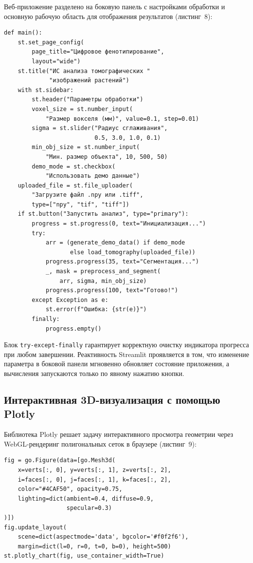 \documentclass[14pt,a4paper]{extreport}
\begin{document}
Веб-приложение разделено на боковую панель с настройками обработки и основную рабочую область для отображения результатов (листинг~8):

\begin{lstlisting}[caption={Архитектура пользовательского интерфейса и управление потоком данных}]
def main():
    st.set_page_config(
        page_title="Цифровое фенотипирование",
        layout="wide")
    st.title("ИС анализа томографических "
             "изображений растений")
    with st.sidebar:
        st.header("Параметры обработки")
        voxel_size = st.number_input(
            "Размер вокселя (мм)", value=0.1, step=0.01)
        sigma = st.slider("Радиус сглаживания",
                          0.5, 3.0, 1.0, 0.1)
        min_obj_size = st.number_input(
            "Мин. размер объекта", 10, 500, 50)
        demo_mode = st.checkbox(
            "Использовать демо данные")
    uploaded_file = st.file_uploader(
        "Загрузите файл .npy или .tiff",
        type=["npy", "tif", "tiff"])
    if st.button("Запустить анализ", type="primary"):
        progress = st.progress(0, text="Инициализация...")
        try:
            arr = (generate_demo_data() if demo_mode
                   else load_tomography(uploaded_file))
            progress.progress(35, text="Сегментация...")
            _, mask = preprocess_and_segment(
                arr, sigma, min_obj_size)
            progress.progress(100, text="Готово!")
        except Exception as e:
            st.error(f"Ошибка: {str(e)}")
        finally:
            progress.empty()
\end{lstlisting}

Блок \texttt{try-except-finally} гарантирует корректную очистку индикатора прогресса при любом завершении. Реактивность Streamlit проявляется в том, что изменение параметра в боковой панели мгновенно обновляет состояние приложения, а вычисления запускаются только по явному нажатию кнопки.

\subsection{Интерактивная 3D-визуализация с помощью Plotly}

Библиотека Plotly решает задачу интерактивного просмотра геометрии через WebGL-рендеринг полигональных сеток в браузере (листинг~9):

\begin{lstlisting}[caption={Конфигурация 3D-сцены и встраивание в веб-интерфейс}]
fig = go.Figure(data=[go.Mesh3d(
    x=verts[:, 0], y=verts[:, 1], z=verts[:, 2],
    i=faces[:, 0], j=faces[:, 1], k=faces[:, 2],
    color="#4CAF50", opacity=0.75,
    lighting=dict(ambient=0.4, diffuse=0.9,
                  specular=0.3)
)])
fig.update_layout(
    scene=dict(aspectmode='data', bgcolor='#f0f2f6'),
    margin=dict(l=0, r=0, t=0, b=0), height=500)
st.plotly_chart(fig, use_container_width=True)
\end{lstlisting}
\end{document}
